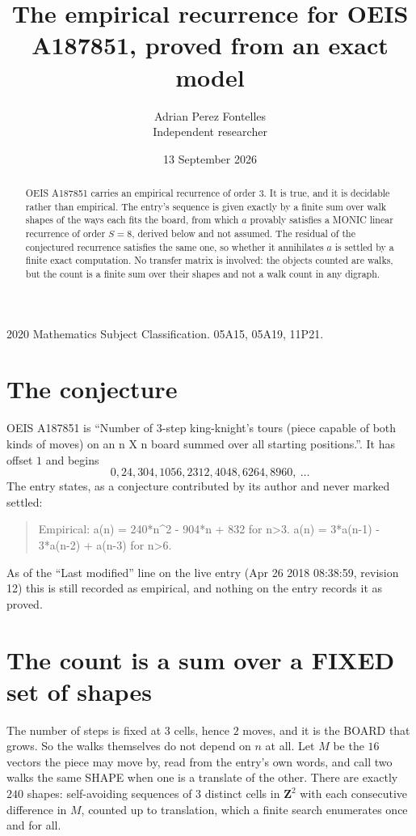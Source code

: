 \documentclass[11pt,a4paper]{article}
\title{The empirical recurrence for OEIS A187851, proved from an exact model}
\author{Adrian Perez Fontelles\\ \small Independent researcher}
\date{13 September 2026}
\theoremstyle{plain}
\theoremstyle{definition}
\begin{document}
\maketitle

\begin{abstract}
OEIS A187851 carries an empirical recurrence of order $3$. It is true, and it is
decidable rather than empirical. The entry's sequence is given exactly by a finite sum over walk shapes of the ways each fits the board, from
which $a$ provably satisfies a MONIC linear recurrence of order $S=8$, derived below and not
assumed. The residual of the conjectured recurrence satisfies the same one, so whether it
annihilates $a$ is settled by a finite exact computation. No transfer matrix is involved: the objects counted are walks, but the count is a finite sum over their shapes and not a walk count in any digraph.
\end{abstract}

\noindent\small 2020 Mathematics Subject Classification. 05A15, 05A19, 11P21.\normalsize

\section{The conjecture}

OEIS A187851 is ``Number of 3-step king-knight's tours (piece capable of both kinds of moves) on an n X n board summed over all starting positions.''. It has offset $1$ and begins
\[
0, 24, 304, 1056, 2312, 4048, 6264, 8960,\ \dots
\]
The entry states, as a conjecture contributed by its author and never marked settled:
\begin{quote}
Empirical: a(n) = 240*n\^{}2 - 904*n + 832 for n>3. a(n) = 3*a(n-1) - 3*a(n-2) + a(n-3) for n>6.
\end{quote}
As of the ``Last modified'' line on the live entry (Apr 26 2018 08:38:59, revision 12)
this is still recorded as empirical, and nothing on the entry records it as proved.

\section{The count is a sum over a FIXED set of shapes}

The number of steps is fixed at $3$ cells, hence $2$ moves, and it is the BOARD
that grows. So the walks themselves do not depend on $n$ at all. Let $M$ be the $16$
vectors the piece may move by, read from the entry's own words, and call two walks the same
SHAPE when one is a translate of the other. There are exactly $240$ shapes: self-avoiding
sequences of $3$ distinct cells in $\mathbf{Z}^{2}$ with each consecutive difference in
$M$, counted up to translation, which a finite search enumerates once and for all.
\end{document}

